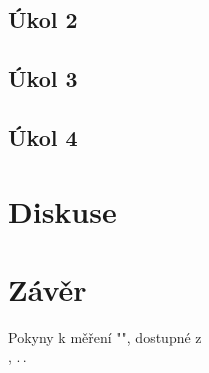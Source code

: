 \documentclass{protokol}
\begin{document}
    \subsection*{Úkol 2}

    \subsection*{Úkol 3}

    \subsection*{Úkol 4}

  \section*{Diskuse}

  \section*{Závěr}

  \begin{thebibliography}{}

    Pokyny k měření "", dostupné z\\ \url{}, .\,.\,
  
  \end{thebibliography}
\end{document}
